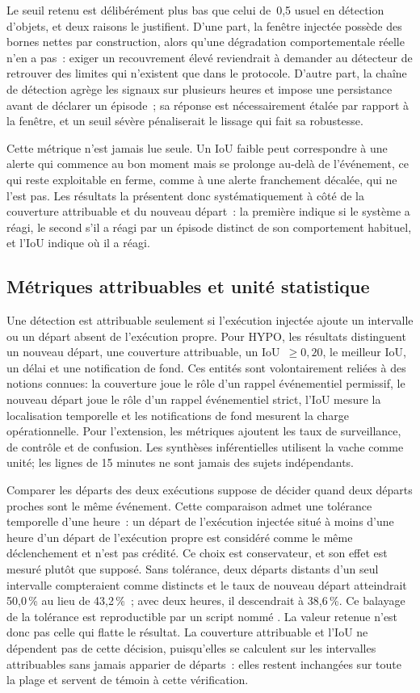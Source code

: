 Le seuil retenu est délibérément plus bas que celui de~0,5 usuel en détection d'objets, et
deux raisons le justifient. D'une part, la fenêtre injectée possède des bornes nettes par
construction, alors qu'une dégradation comportementale réelle n'en a pas~: exiger un
recouvrement élevé reviendrait à demander au détecteur de retrouver des limites qui n'existent
que dans le protocole. D'autre part, la chaîne de détection agrège les signaux sur plusieurs
heures et impose une persistance avant de déclarer un épisode~; sa réponse est nécessairement
étalée par rapport à la fenêtre, et un seuil sévère pénaliserait le lissage qui fait sa
robustesse.

Cette métrique n'est jamais lue seule. Un IoU faible peut correspondre à une alerte qui
commence au bon moment mais se prolonge au-delà de l'événement, ce qui reste exploitable en
ferme, comme à une alerte franchement décalée, qui ne l'est pas. Les résultats la présentent
donc systématiquement à côté de la couverture attribuable et du nouveau départ~: la première
indique si le système a réagi, le second s'il a réagi par un épisode distinct de son
comportement habituel, et l'IoU indique où il a réagi.

\subsection{Métriques attribuables et unité statistique}
Une détection est attribuable seulement si l'exécution injectée ajoute un intervalle ou un
départ absent de l'exécution propre. Pour HYPO, les résultats distinguent un nouveau départ,
une couverture attribuable, un IoU~$\geq0{,}20$, le meilleur IoU, un délai et une notification
de fond. Ces entités sont volontairement reliées à des notions connues: la couverture joue le
rôle d'un rappel événementiel permissif, le nouveau départ joue le rôle d'un rappel
événementiel strict, l'IoU mesure la localisation temporelle et les notifications de fond
mesurent la charge opérationnelle. Pour
l'extension, les métriques ajoutent les taux de surveillance, de contrôle et de confusion. Les
synthèses inférentielles utilisent la vache comme unité; les lignes de 15 minutes ne sont
jamais des sujets indépendants.

Comparer les départs des deux exécutions suppose de décider quand deux départs proches sont le
même événement. Cette comparaison admet une tolérance temporelle d'une heure~: un départ de
l'exécution injectée situé à moins d'une heure d'un départ de l'exécution propre est considéré
comme le même déclenchement et n'est pas crédité. Ce choix est conservateur, et son effet est
mesuré plutôt que supposé. Sans tolérance, deux départs distants d'un seul intervalle
compteraient comme distincts et le taux de nouveau départ atteindrait 50,0\,\% au lieu de
43,2\,\%~; avec deux heures, il descendrait à 38,6\,\%. Ce balayage de la tolérance est
reproductible par un script nommé
. La valeur retenue n'est donc pas celle
qui flatte le résultat. La couverture attribuable et l'IoU ne dépendent pas de cette décision,
puisqu'elles se calculent sur les intervalles attribuables sans jamais apparier de départs~:
elles restent inchangées sur toute la plage et servent de témoin à cette vérification.

